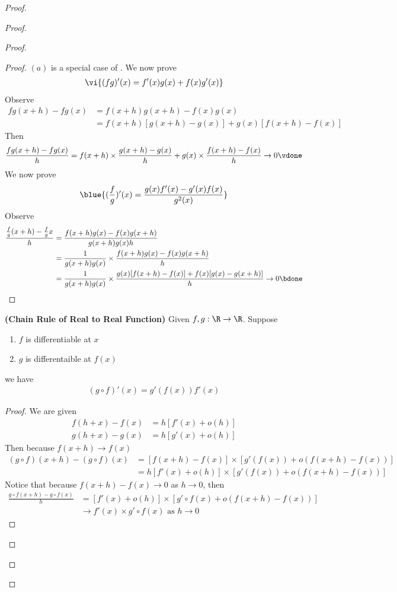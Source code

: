 \documentclass{report}
\begin{document}
\begin{proof}
\begin{proof}
\begin{proof}
\begin{theorem}
\begin{enumerate}[label=(\alph*)]
\end{enumerate}
\end{theorem}
\begin{proof}
$(a)$ is a special case of . We now prove 
\begin{align*}
  \vi{(fg)'(x)=f'(x)g(x)+f(x)g'(x)}
\end{align*}
Observe 
\begin{align*}
fg(x+h)-fg(x)&=f(x+h)g(x+h)-f(x)g(x)\\
&=f(x+h)[g(x+h)-g(x)]+g(x)[f(x+h)-f(x)]
\end{align*}
Then 
\begin{align*}
\frac{fg(x+h)-fg(x)}{h}=f(x+h) \times \frac{g(x+h)-g(x)}{h}+ g(x) \times \frac{f(x+h)-f(x)}{h} \to 0 \vdone
\end{align*}
We now prove 
\begin{align*}
  \blue{(\frac{f}{g})'(x)=\frac{g(x)f'(x)-g'(x)f(x)}{g^2(x)}}
\end{align*}
Observe 
\begin{align*}
\frac{\frac{f}{g}(x+h)-\frac{f}{g}x}{h}&=\frac{f(x+h)g(x)-f(x)g(x+h)}{g(x+h)g(x)h}\\
&=\frac{1}{g(x+h)g(x)} \times \frac{f(x+h)g(x)-f(x)g(x+h)}{h}\\
&=\frac{1}{g(x+h)g(x)}\times \frac{g(x) [f(x+h)-f(x)]+f(x)[g(x)-g(x+h)]}{h} \to 0 \bdone
\end{align*}
\end{proof}
\begin{theorem}
\label{6.1.4}
\textbf{(Chain Rule of Real to Real Function)} Given $f,g:\R\rightarrow \R$. Suppose 
\begin{enumerate}[label=(\alph*)]
  \item $f$ is differentiable at  $x$ 
  \item  $g$ is differentaible at  $f(x)$
\end{enumerate}
we have 
\begin{align*}
  (g \circ  f)'(x)=g'(f(x)) f'(x)
\end{align*}
\end{theorem}
\begin{proof}
We are given 
\begin{align*}
f(h+x)-f(x)&=h[f'(x)+o(h)]\\
g(h+x)-g(x)&=h[g'(x)+o(h)]
\end{align*}
Then because $f(x+h)\to f(x)$ 
\begin{align*}
  (g\circ f)(x+h)- (g\circ f)(x)&= [f(x+h)-f(x)]\times [g'(f(x))+o(f(x+h)-f(x))]\\
  &=h[f'(x)+o(h)]\times [g'(f(x))+o (f(x+h)-f(x))]
\end{align*}
Notice that because $f(x+h)-f(x)\to 0$ as $h \to 0$, then 
\begin{align*}
\frac{g \circ  f(x+h)-g \circ  f(x)}{h}&=[f'(x)+o(h)]\times [g'\circ  f(x)+ o (f(x+h)-f(x))]\\
&\to f'(x) \times g' \circ  f(x) \text{ as  }h\to 0
\end{align*}
\end{proof}

\end{proof}
\end{proof}
\end{proof}
\end{document}
